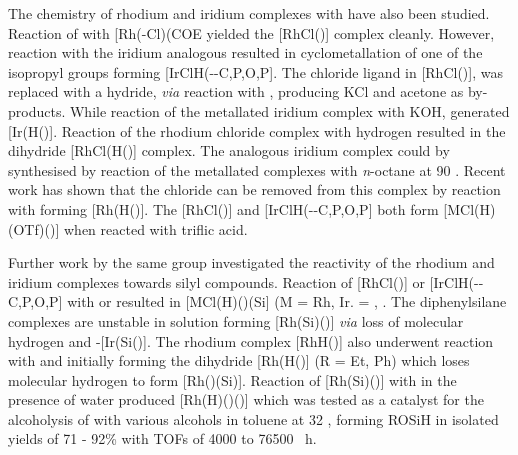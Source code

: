The chemistry of rhodium and iridium complexes with \iPrxantphos{} have also been studied.  Reaction of \iPrxantphos{} with [Rh(\hapto{}-Cl)(COE\ce{)2]2} yielded the [RhCl(\iPrxantphosk)] complex cleanly.\cite{Esteruelas2013}  However, reaction with the iridium analogous resulted in cyclometallation of one of the isopropyl groups  forming [IrClH(\iPrxantphos-\dento{}-C,P,O,P\textprime].  The chloride ligand in [RhCl(\iPrxantphosk)], was replaced with a hydride, \emph{via} reaction with , producing KCl and acetone as by-products.  While reaction of the metallated iridium complex with KOH,  generated [Ir(H(\iPrxantphosk)].  Reaction of the rhodium chloride complex with hydrogen resulted in the dihydride [RhCl(H(\iPrxantphosk)] complex.  The analogous iridium complex could by synthesised by reaction of the metallated complexes with \emph{n}-octane at 90 \degC.  Recent work has shown that the chloride can be removed from this complex by reaction with  forming [Rh\ce(H(\iPrxantphosk)].\cite{Haibach2013}  The [RhCl(\iPrxantphosk)] and [IrClH(\iPrxantphos-\dento{}-C,P,O,P\textprime] both form [MCl(H)(OTf)(\iPrxantphosk)] when reacted with triflic acid.

Further work by the same group investigated the reactivity of the rhodium and iridium complexes towards silyl compounds.\cite{Esteruelas2013b}  Reaction of [RhCl(\iPrxantphosk)] or [IrClH(\iPrxantphos-\dento{}-C,P,O,P\textprime] with  or  resulted in [MCl(H)(\iPrxantphosk)(Si] (M = Rh, Ir.  = , .  The diphenylsilane complexes are unstable in solution forming [Rh(Si)(\iPrxantphosk)] \emph{via} loss of molecular hydrogen and \trans{}-[Ir(Si(\iPrxantphosk)].  The rhodium complex [RhH(\iPrxantphos)] also underwent reaction with  and  initially forming the dihydride [Rh(H(\iPrxantphosk)] (R = Et, Ph) which loses molecular hydrogen to form [Rh(\iPrxantphosk)(Si)].  Reaction of [Rh(Si)(\iPrxantphosk)] with   in the presence of water produced [Rh(H)(\iPrxantphosk)()] which was tested as a catalyst for the alcoholysis of  with various alcohols in toluene at 32 \degC, forming ROSiH in isolated yields of 71 - 92\% with \glspl{TOF} of 4000 to 76500 \si{\per\hour}.


